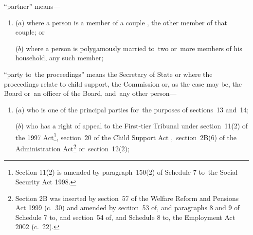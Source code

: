 \documentclass[12pt,a4paper]{article}
\begin{document}
\begin{enumerate}

“partner” means—
\begin{enumerate}\item[]
    ($a$) 
    where a person is a member of 
a couple%
, the other member of that couple; or

    ($b$) 
    where a person is polygamously married to~two or~more members of his household, any such member;
\end{enumerate}

“party to~the proceedings” means the Secretary of State 
or where the proceedings relate to child support, the Commission  %
or, as the case may be, the Board or~an officer of the Board,  %
and~any other person—
\begin{enumerate}\item[]
($a$) who is one of the principal parties for~the purposes of sections~13 and~14;

($b$) who has a right of appeal to 
the First-tier Tribunal  %
under section~11(2) of the 1997 Act\footnote{\frenchspacing Section 11(2) is amended by paragraph~150(2) of Schedule 7 to~the Social Security Act 1998.}, section~20 of the Child Support Act%
,~section~2B(6) of the Administration Act\footnote{Section 2B was inserted by section~57 of the Welfare Reform and Pensions Act 1999 (c.~30) and amended by section~53 of, and paragraphs 8 and 9 of Schedule 7 to, and section~54 of, and Schedule 8 to, the Employment Act 2002 (c.~22).}  %
or~section~12(2);
\end{enumerate}



\end{enumerate}
\end{document}
